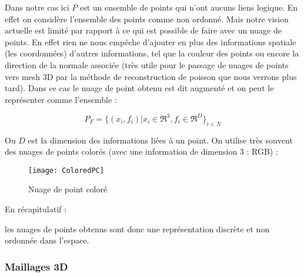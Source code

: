 Dans notre cas ici $P$ est un ensemble de points qui n'ont aucuns liens logique. En effet on considère l'ensemble des points comme non ordonné.
Mais notre vision actuelle est limité par rapport à ce qui est possible de faire avec un nuage de points. En effet rien ne nous empêche d'ajouter en plus des informations spatiale (les coordonnées) d'autres informations, tel que la couleur des points ou encore la direction de la normale associée (très utile pour le passage de nuages de points vers mesh 3D par la méthode de reconstruction de poisson que nous verrons plus tard). Dans ce cas le nuage de point obtenu est dit augmenté et on peut le représenter comme l'ensemble :

$$ P_{F} = \{ (x_{i}, f_{i}) | x_{i} \in \Re^{3}, f_{i} \in \Re^{D} \}_{i<N} $$

Ou $D$ est la dimension des informations liées à un point.
On utilise très souvent des nuages de points colorés (avec une information de dimension 3 : RGB) :

\begin{figure}[h]
    \centering
    \texttt{[image: ColoredPC]}
    \caption{Nuage de point coloré}
    \label{fig:pointCloud2}
\end{figure}


En récapitulatif :

\begin{figure}[h]
 \hfill 	
 \hfill	
\caption{}
\end{figure}

les nuages de points obtenus sont donc une représentation discrète et non ordonnée dans l'espace.

\FloatBarrier
\subsubsection{Maillages 3D}
